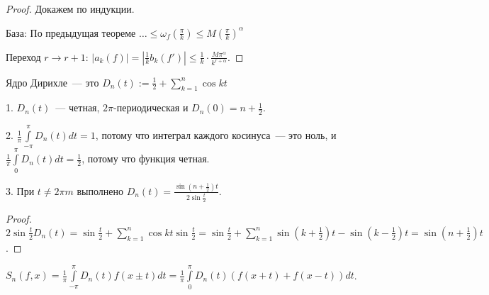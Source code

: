\begin{proof}
    Докажем по индукции.

    База: По предыдущая теореме $\ldots \le \omega_f(\frac{\pi}{k}) \le M (\frac{\pi}{k})^{\alpha}$

    Переход $r \to r + 1$:
    $|a_k(f)| = |\frac{1}{k} b_k(f')| \le \frac{1}{k} \cdot \frac{M \pi^{\alpha}}{k^{r + \alpha}}$.
\end{proof}

\begin{definition}
    Ядро Дирихле~--- это $D_n(t) := \frac{1}{2} + \sum \limits_{k = 1}^{n} \cos kt$
\end{definition}

\begin{properties}
    1. $D_n(t)$~--- четная, $2 \pi$-периодическая и $D_n(0) = n + \frac{1}{2}$.

    2. $\frac{1}{\pi} \int \limits_{-\pi}^{\pi} D_n(t) dt = 1$, потому что интеграл каждого косинуса~--- это ноль, и  $\frac{1}{\pi} \int \limits_{0}^{\pi} D_n(t) dt = \frac{1}{2}$,
    потому что функция четная.

    3. При $t \neq 2 \pi m$ выполнено $D_n(t) = \frac{\sin(n + \frac{1}{2}) t}{2 \sin \frac{t}{2}}$.
\end{properties}

\begin{proof}
    $2 \sin \frac{t}{2} D_n(t) = \sin \frac{t}{2} + \sum \limits_{k = 1}^{n} \cos kt \sin \frac{t}{2} =
        \sin \frac{t}{2} + \sum \limits_{k = 1}^{n} \sin(k + \frac{1}{2}) t - \sin (k - \frac{1}{2}) t = \sin(n + \frac{1}{2}) t$.
\end{proof}

\begin{lemma}
    $S_n(f, x) = \frac{1}{\pi} \int \limits_{-\pi}^{\pi} D_n(t) f(x \pm t) dt =
        \frac{1}{\pi} \int \limits_{0}^{\pi} D_n(t) (f(x + t) + f(x - t)) dt$.
\end{lemma}

